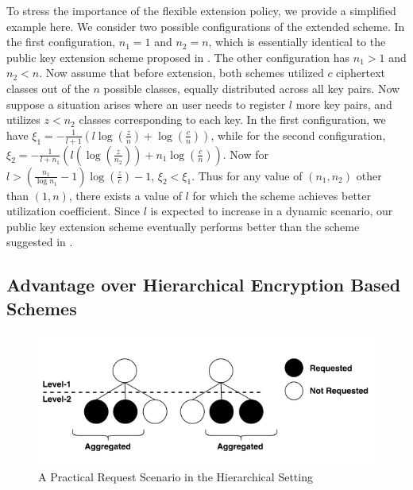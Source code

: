 To stress the importance of the flexible extension policy, we provide a simplified example here. We consider two possible configurations of the extended scheme. In the first configuration, $n_1=1$ and $n_2=n$, which is essentially identical to the public key extension scheme proposed in \cite{chu2014key}. The other configuration has $n_1>1$ and $n_2<n$. Now assume that before extension, both schemes utilized $c$ ciphertext classes out of the $n$ possible classes, equally distributed across all key pairs. Now suppose a situation arises where an user needs to register $l$ more key pairs, and utilizes $z<n_2$ classes corresponding to each key. In the first configuration, we have $\xi_1=-\frac{1}{l+1}(l\log(\frac{z}{n})+\log(\frac{c}{n}))$, while for the second configuration, $\xi_2=-\frac{1}{l+n_1}(l(\log(\frac{z}{n_2}))+n_1\log(\frac{c}{n}))$. Now for $l>(\frac{n_1}{\log n_1}-1)\log(\frac{z}{c})-1$, $\xi_2<\xi_1$. Thus for any value of $(n_1,n_2)$ other than $(1,n)$, there exists a value of $l$ for which the 
scheme achieves better utilization coefficient. Since $l$ is expected to increase in a dynamic scenario, our public key extension scheme eventually performs better than the scheme suggested in \cite{chu2014key}. 

\subsection{Advantage over Hierarchical Encryption Based Schemes}
\label{subsec:advantage}

\begin{figure}[!t]
\centering
\captionsetup{font=scriptsize}
\includegraphics[scale=0.4]{Figs/tree.png}
\caption{A Practical Request Scenario in the Hierarchical Setting}
\label{fig:agg}
\end{figure}

